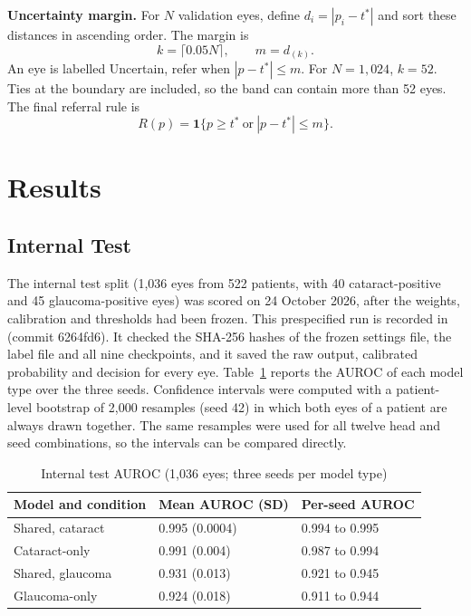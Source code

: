 \documentclass[conference,a4paper]{IEEEtran}
\newcommand{\peachaddition}[1]{%
  \par\smallskip\noindent
  \begingroup\setlength{\fboxsep}{5pt}%
  \colorbox{reviewpeach}{\begin{minipage}{\dimexpr\linewidth-2\fboxsep\relax}
  #1
  \end{minipage}}\endgroup\par\smallskip
}
\begin{document}
\peachaddition{
\textbf{Uncertainty margin.}
For $N$ validation eyes, define $d_i=|p_i-t^*|$ and sort these distances in
ascending order. The margin is
\[
k=\lceil0.05N\rceil,\qquad m=d_{(k)}.
\]
An eye is labelled Uncertain, refer when $|p-t^*|\leq m$.
For $N=1{,}024$, $k=52$. Ties at the boundary are included, so the band can
contain more than 52 eyes. The final referral rule is
\[
R(p)=\mathbf{1}\{p\geq t^*\ \text{or}\ |p-t^*|\leq m\}.
\]
}

\section{Results}

\subsection{Internal Test}

The internal test split (1,036 eyes from 522 patients, with 40 cataract-positive and 45
glaucoma-positive eyes) was scored on 24 October 2026, after the weights, calibration and thresholds
had been frozen. This prespecified run is recorded in
 (commit 6264fd6). It checked the SHA-256
hashes of the frozen settings file, the label file and all nine checkpoints, and it saved the raw
output, calibrated probability and decision for every eye. Table~\ref{tab:I} reports the AUROC of
each model type over the three seeds. Confidence intervals were computed with a patient-level
bootstrap of 2,000 resamples (seed 42) in which both eyes of a patient are always drawn together.
The same resamples were used for all twelve head and seed combinations, so the intervals can be
compared directly.

\begin{table}[t]
\caption{Internal test AUROC (1,036 eyes; three seeds per model type)}
\label{tab:I}\centering\footnotesize
\begin{tabular}{@{}lll@{}}\toprule
Model and condition & Mean AUROC (SD) & Per-seed AUROC \\ \midrule
Shared, cataract & 0.995 (0.0004) & 0.994 to 0.995 \\
Cataract-only & 0.991 (0.004) & 0.987 to 0.994 \\
Shared, glaucoma & 0.931 (0.013) & 0.921 to 0.945 \\
Glaucoma-only & 0.924 (0.018) & 0.911 to 0.944 \\ \bottomrule
\end{tabular}\end{table}
\end{document}

